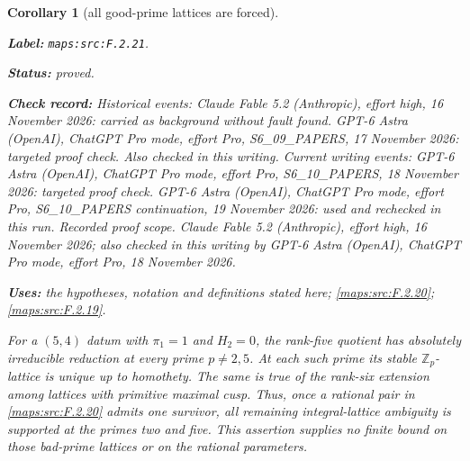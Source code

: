 \documentclass[11pt,a4paper]{article}
\newtheorem{corollary}[corollary]{Corollary}
\theoremstyle{definition}
\newcommand{\StatementRecord}[4]{\par\smallskip\begingroup\upshape\raggedright\noindent\textbf{Label:} \nolinkurl{#1}.\par\noindent\textbf{Status:} #2.\par\noindent\textbf{Check record:} #3.\par\noindent\textbf{Uses:} #4.\par\endgroup\smallskip}
\begin{document}
\begin{corollary}[all good-prime lattices are forced]\label{maps:src:F.2.21}
\StatementRecord{maps:src:F.2.21}{proved}{Historical events: Claude Fable 5.2 (Anthropic), effort high, 16 November 2026: carried as background without fault found. GPT-6 Astra (OpenAI), ChatGPT Pro mode, effort Pro, S6\_09\_PAPERS, 17 November 2026: targeted proof check. Also checked in this writing. Current writing events: GPT-6 Astra (OpenAI), ChatGPT Pro mode, effort Pro, S6\_10\_PAPERS, 18 November 2026: targeted proof check. GPT-6 Astra (OpenAI), ChatGPT Pro mode, effort Pro, S6\_10\_PAPERS continuation, 19 November 2026: used and rechecked in this run. \emph{Recorded proof scope.} Claude Fable 5.2 (Anthropic), effort high, 16 November 2026; also checked in this writing by GPT-6 Astra (OpenAI), ChatGPT Pro mode, effort Pro, 18 November 2026}{the hypotheses, notation and definitions stated here; \cref{maps:src:F.2.20}; \cref{maps:src:F.2.19}}


For a $(5,4)$ datum with $\pi_1=1$ and $H_2=0$, the
rank-five quotient has absolutely irreducible reduction
at every prime $p\ne2,5$.  At each such prime its stable
$\mathbb Z_p$-lattice is unique up to homothety.
The same is true of the rank-six extension among lattices
with primitive maximal cusp.  Thus, once a rational pair
in \ref{maps:src:F.2.20} admits one survivor, all remaining integral-lattice
ambiguity is supported at the primes two and five.
This assertion supplies no finite bound on those bad-prime
lattices or on the rational parameters.

\end{corollary}
\end{document}
